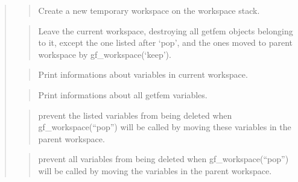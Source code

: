 \documentclass[a4paper,11pt,english]{sphinxmanual}
\begin{document}
\sphinxAtStartPar
{}
\begin{quote}

\sphinxAtStartPar
{}
\begin{quote}

\sphinxAtStartPar
Create a new temporary workspace on the workspace stack.
\end{quote}

\sphinxAtStartPar
{}
\begin{quote}

\sphinxAtStartPar
Leave the current workspace, destroying all getfem objects
belonging to it, except the one listed after ‘pop’, and the ones
moved to parent workspace by gf\_workspace(‘keep’).
\end{quote}

\sphinxAtStartPar
{}
\begin{quote}

\sphinxAtStartPar
Print informations about variables in current workspace.
\end{quote}

\sphinxAtStartPar
{}
\begin{quote}

\sphinxAtStartPar
Print informations about all getfem variables.
\end{quote}

\sphinxAtStartPar
{}
\begin{quote}

\sphinxAtStartPar
prevent the listed variables from being deleted when
gf\_workspace(“pop”) will be called by moving these variables in the
parent workspace.
\end{quote}

\sphinxAtStartPar
{}
\begin{quote}

\sphinxAtStartPar
prevent all variables from being deleted when
gf\_workspace(“pop”) will be called by moving the variables in the
parent workspace.
\end{quote}


\end{quote}
\end{document}
